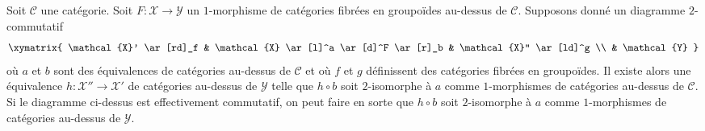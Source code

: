 \begin{lemma}
\label{lemma-amelioration-unique}
Soit $\mathcal{C}$ une catégorie. Soit $F : \mathcal{X} \to \mathcal{Y}$
un $1$-morphisme de catégories fibrées en groupoïdes au-dessus de $\mathcal{C}$.
Supposons donné un diagramme $2$-commutatif
$$
\xymatrix{
\mathcal{X}' \ar[rd]_f &
\mathcal{X} \ar[l]^a \ar[d]^F \ar[r]_b &
\mathcal{X}'' \ar[ld]^g \\
& \mathcal{Y}
}
$$
où $a$ et $b$ sont des équivalences de catégories au-dessus de $\mathcal{C}$
et où $f$ et $g$ définissent des catégories fibrées en groupoïdes. Il existe alors
une équivalence $h : \mathcal{X}'' \to \mathcal{X}'$ de catégories au-dessus de
$\mathcal{Y}$ telle que $h \circ b$ soit $2$-isomorphe à $a$ comme $1$-morphismes
de catégories au-dessus de $\mathcal{C}$. Si le diagramme ci-dessus est effectivement
commutatif, on peut faire en sorte que $h \circ b$ soit $2$-isomorphe à $a$ comme
$1$-morphismes de catégories au-dessus de $\mathcal{Y}$.
\end{lemma}


